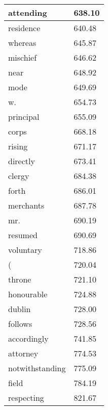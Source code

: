 \documentclass{article}
\begin{document}
\begin{longtable}[c]{ll}
\multicolumn{1}{l|}{attending}       & 638.10  \\ \hline
\multicolumn{1}{l|}{residence}       & 640.48  \\ \hline
\multicolumn{1}{l|}{whereas}         & 645.87  \\ \hline
\multicolumn{1}{l|}{mischief}        & 646.62  \\ \hline
\multicolumn{1}{l|}{near}            & 648.92  \\ \hline
\multicolumn{1}{l|}{mode}            & 649.69  \\ \hline
\multicolumn{1}{l|}{w.}              & 654.73  \\ \hline
\multicolumn{1}{l|}{principal}       & 655.09  \\ \hline
\multicolumn{1}{l|}{corps}           & 668.18  \\ \hline
\multicolumn{1}{l|}{rising}          & 671.17  \\ \hline
\multicolumn{1}{l|}{directly}        & 673.41  \\ \hline
\multicolumn{1}{l|}{clergy}          & 684.38  \\ \hline
\multicolumn{1}{l|}{forth}           & 686.01  \\ \hline
\multicolumn{1}{l|}{merchants}       & 687.78  \\ \hline
\multicolumn{1}{l|}{mr.}             & 690.19  \\ \hline
\multicolumn{1}{l|}{resumed}         & 690.69  \\ \hline
\multicolumn{1}{l|}{voluntary}       & 718.86  \\ \hline
\multicolumn{1}{l|}{(}               & 720.04  \\ \hline
\multicolumn{1}{l|}{throne}          & 721.10  \\ \hline
\multicolumn{1}{l|}{honourable}      & 724.88  \\ \hline
\multicolumn{1}{l|}{dublin}          & 728.00  \\ \hline
\multicolumn{1}{l|}{follows}         & 728.56  \\ \hline
\multicolumn{1}{l|}{accordingly}     & 741.85  \\ \hline
\multicolumn{1}{l|}{attorney}        & 774.53  \\ \hline
\multicolumn{1}{l|}{notwithstanding} & 775.09  \\ \hline
\multicolumn{1}{l|}{field}           & 784.19  \\ \hline
\multicolumn{1}{l|}{respecting}      & 821.67  \\ \hline

\end{longtable}
\end{document}
